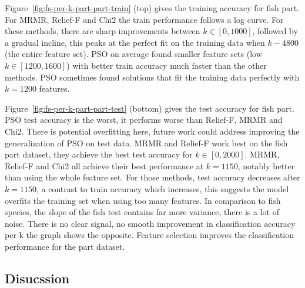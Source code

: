 \documentclass[runningheads]{llncs}
\begin{document}

Figure~\ref{fig:fs-per-k-part-part-train} (top) gives the training accuracy for fish part. 
For MRMR, Relief-F and Chi2 the train performance follows a log curve.
For these methods, there are sharp improvements between $k \in [0,1000]$, followed by a gradual incline, this peaks at the perfect fit on the training data when $k-4800$ (the entire feature set). 
PSO on average found smaller feature sets (low $k \in [1200,1600]$) with better train accuracy much faster than the other methods. 
PSO sometimes found solutions that fit the training data perfectly with $k = 1200$ features. 

Figure~\ref{fig:fs-per-k-part-part-test} (bottom) gives the test accuracy for fish part. 
PSO test accuracy is the worst, it performs worse than Relief-F, MRMR and Chi2. 
There is potential overfitting here, future work could address improving the generalization of PSO on test data. 
MRMR and Relief-F work best on the fish part dataset, they achieve the best test accuracy for $k \in [0,2000]$.
MRMR, Relief-F and Chi2 all achieve their best performance at $k = 1150$, notably better than using the whole feature set. 
For those methods, test accuracy decreases after $k = 1150$, a contrast to train accuracy which increases, this suggests the model overfits the training set when using too many features.
In comparison to fish species, the slope of the fish test contains far more variance, there is a lot of noise.
There is no clear signal, no smooth improvement in classification accuracy per k the graph shows the opposite. 
Feature selection improves the classification performance for the part dataset. 

\subsection{Disucssion}
\label{sec:results-feature-selection-discussion}

\end{document}
